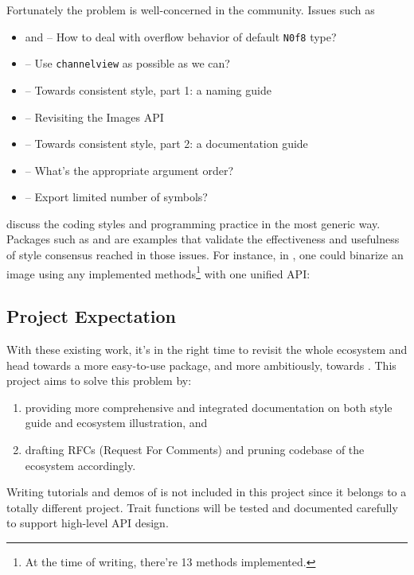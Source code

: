 Fortunately the problem is well-concerned in the community. Issues such as
\begin{itemize}
    \item {} and  -- How to deal with overflow behavior of default \texttt{N0f8} type?
    \item {} -- Use \texttt{channelview} as possible as we can?
    \item {} -- Towards consistent style, part 1: a naming guide
    \item {} -- Revisiting the Images API
    \item {} -- Towards consistent style, part 2: a documentation guide
    \item {} -- What's the appropriate argument order?
    \item {} -- Export limited number of symbols?
\end{itemize}
discuss the coding styles and programming practice in the most generic way. Packages such as \repohistogramthresholding and \repoimagebinarization are examples that validate the effectiveness and usefulness of style consensus reached in those issues. For instance, in \imagebinarization, one could binarize an image using any implemented methods\footnote{At the time of writing, there're 13 methods implemented.} with one unified API:

\subsection*{Project Expectation}
With these existing work, it's in the right time to revisit the whole \images{} ecosystem and head towards a more easy-to-use \images{} package, and more ambitiously, towards \images{} . This project aims to solve this problem by:
\begin{enumerate}
    \item providing more comprehensive and integrated documentation on both style guide and ecosystem illustration, and
    \item drafting RFCs (Request For Comments) and pruning codebase of the ecosystem accordingly.
\end{enumerate}
Writing tutorials and demos of \images{} is not included in this project since it belongs to a totally different project. Trait functions will be tested and documented carefully to support high-level API design.

